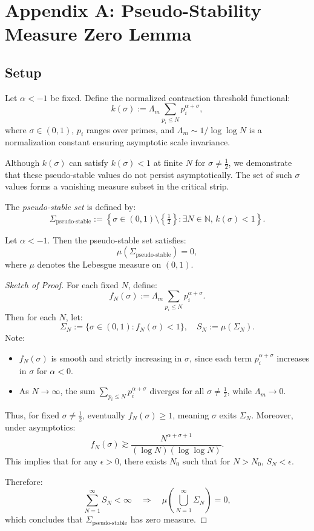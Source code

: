 \documentclass[12pt]{article}
\begin{document}
\section{Appendix A: Pseudo-Stability Measure Zero Lemma}

\subsection*{Setup}

Let $\alpha < -1$ be fixed. Define the normalized contraction threshold functional:
\[
k(\sigma) := \Lambda_m \sum_{p_i \le N} p_i^{\alpha + \sigma},
\]
where $\sigma \in (0,1)$, $p_i$ ranges over primes, and $\Lambda_m \sim 1/\log \log N$ is a normalization constant ensuring asymptotic scale invariance. 

Although $k(\sigma)$ can satisfy $k(\sigma) < 1$ at finite $N$ for $\sigma \ne \tfrac{1}{2}$, we demonstrate that these pseudo-stable values do not persist asymptotically. The set of such $\sigma$ values forms a vanishing measure subset in the critical strip.

\begin{definition}
The \emph{pseudo-stable set} is defined by:
\[
\Sigma_{\text{pseudo-stable}} := \left\{ \sigma \in (0,1) \setminus \left\{ \tfrac{1}{2} \right\} : \exists N \in \mathbb{N}, \, k(\sigma) < 1 \right\}.
\]
\end{definition}

\begin{lemma}
\label{lemma:pseudostable}
Let $\alpha < -1$. Then the pseudo-stable set satisfies:
\[
\mu(\Sigma_{\text{pseudo-stable}}) = 0,
\]
where $\mu$ denotes the Lebesgue measure on $(0,1)$.
\end{lemma}

\begin{proof}[Sketch of Proof]
For each fixed $N$, define:
\[
f_N(\sigma) := \Lambda_m \sum_{p_i \le N} p_i^{\alpha + \sigma}.
\]
Then for each $N$, let:
\[
\Sigma_N := \{ \sigma \in (0,1) : f_N(\sigma) < 1 \}, \quad S_N := \mu(\Sigma_N).
\]
Note:
\begin{itemize}
    \item $f_N(\sigma)$ is smooth and strictly increasing in $\sigma$, since each term $p_i^{\alpha + \sigma}$ increases in $\sigma$ for $\alpha < 0$.
    \item As $N \to \infty$, the sum $\sum_{p_i \le N} p_i^{\alpha + \sigma}$ diverges for all $\sigma \ne \tfrac{1}{2}$, while $\Lambda_m \to 0$.
\end{itemize}

Thus, for fixed $\sigma \ne \tfrac{1}{2}$, eventually $f_N(\sigma) \ge 1$, meaning $\sigma$ exits $\Sigma_N$. Moreover, under asymptotics:
\[
f_N(\sigma) \gtrsim \frac{N^{\alpha + \sigma + 1}}{(\log N)(\log \log N)}.
\]
This implies that for any $\epsilon > 0$, there exists $N_0$ such that for $N > N_0$, $S_N < \epsilon$.

Therefore:
\[
\sum_{N=1}^{\infty} S_N < \infty \quad \Rightarrow \quad \mu\left( \bigcup_{N=1}^\infty \Sigma_N \right) = 0,
\]
which concludes that $\Sigma_{\text{pseudo-stable}}$ has zero measure.
\end{proof}
\end{document}
